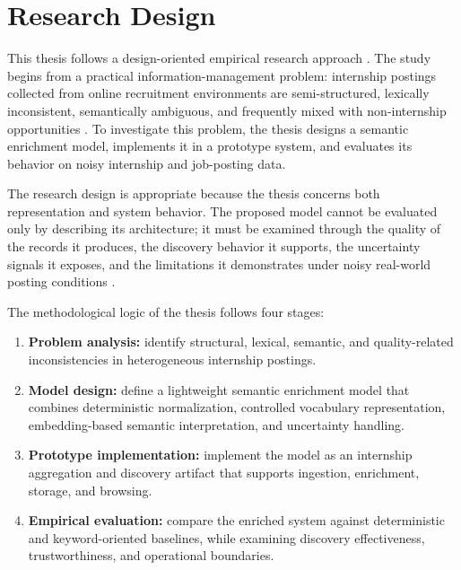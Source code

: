 \section{Research Design}

This thesis follows a design-oriented empirical research approach \cite{hevner2004design, peffers2007design}. The study begins from a practical information-management problem: internship postings collected from online recruitment environments are semi-structured, lexically inconsistent, semantically ambiguous, and frequently mixed with non-internship opportunities \cite{batini2009methodologies}. To investigate this problem, the thesis designs a semantic enrichment model, implements it in a prototype system, and evaluates its behavior on noisy internship and job-posting data.

The research design is appropriate because the thesis concerns both representation and system behavior. The proposed model cannot be evaluated only by describing its architecture; it must be examined through the quality of the records it produces, the discovery behavior it supports, the uncertainty signals it exposes, and the limitations it demonstrates under noisy real-world posting conditions \cite{peffers2007design, wohlin2012experimentation}.

The methodological logic of the thesis follows four stages:

\begin{enumerate}[label=\textbf{Stage \arabic*:}, start=1, leftmargin=2.2cm]
    \item \textbf{Problem analysis:} identify structural, lexical, semantic, and quality-related inconsistencies in heterogeneous internship postings.

    \item \textbf{Model design:} define a lightweight semantic enrichment model that combines deterministic normalization, controlled vocabulary representation, embedding-based semantic interpretation, and uncertainty handling.

    \item \textbf{Prototype implementation:} implement the model as an internship aggregation and discovery artifact that supports ingestion, enrichment, storage, and browsing.

    \item \textbf{Empirical evaluation:} compare the enriched system against deterministic and keyword-oriented baselines, while examining discovery effectiveness, trustworthiness, and operational boundaries.
\end{enumerate}

